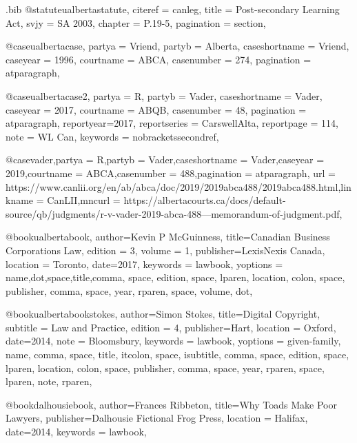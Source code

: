 \begin{filecontents*}[overwrite]{\jobname.bib}
@statute{ualbertastatute,
citeref = {canleg},
title = {Post-secondary Learning Act},
svjy = {SA 2003},
chapter = {P.19-5},
pagination = {section},
}

@case{ualbertacase,
  partya = {Vriend}, 
  partyb = {Alberta},
  caseshortname = {Vriend},
  caseyear = {1996},
  courtname = {ABCA},
  casenumber = {274},
  pagination = {atparagraph},
}


@case{ualbertacase2,
  partya = {R}, 
  partyb = {Vader},
  caseshortname = {Vader},
  caseyear = {2017},
  courtname = {ABQB},
  casenumber = {48},
  pagination = {atparagraph},
  reportyear={2017},
  reportseries = {CarswellAlta},
  reportpage = {114},
  note = {WL Can},
  keywords = {nobracketssecondref},
}


@case{vader,partya =  {R},partyb =  {Vader},caseshortname =  {Vader},caseyear =  {2019},courtname =  {ABCA},casenumber =  {488},pagination =  {atparagraph}, url =  {https://www.canlii.org/en/ab/abca/doc/2019/2019abca488/2019abca488.html},linkname =  {CanLII},mncurl =  {https://albertacourts.ca/docs/default-source/qb/judgments/r-v-vader-2019-abca-488---memorandum-of-judgment.pdf},}


@book{ualbertabook,
author={Kevin P McGuinness},
title={Canadian Business Corporations Law},
edition = {3},
volume = {1},
publisher={LexisNexis Canada},
location = {Toronto},
date={2017},
keywords = {lawbook},
yoptions = {name,dot,space,title,comma,
space,
edition,
space,
lparen, 
location,
colon,
space,
publisher,
comma,
space,
year,
rparen,
space,
volume,
dot},
}



@book{ualbertabookstokes,
author={Simon Stokes},
title={Digital Copyright},
subtitle = {Law and Practice},
edition = {4},
publisher={Hart},
location = {Oxford},
date={2014},
note = {Bloomsbury},
keywords = {lawbook},
yoptions = {given-family,
name,
comma,
space,
title,
itcolon,
space,
isubtitle,
comma,
space,
edition,
space,
lparen, 
location,
colon,
space,
publisher,
comma,
space,
year,
rparen,
space,
lparen,
note,
rparen},
}




@book{dalhousiebook,
author={Frances Ribbeton},
title={Why Toads Make Poor Lawyers},
publisher={Dalhousie Fictional Frog Press},
location = {Halifax},
date={2014},
keywords = {lawbook},
}


\end{filecontents*}
